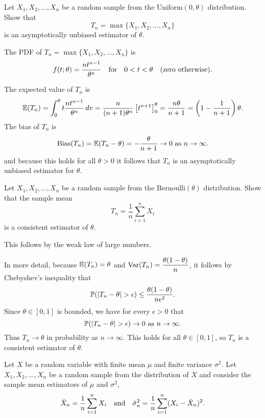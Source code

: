 \begin{exercise}
\begin{questions}

\question
Let $X_1,X_2,\ldots,X_n$ be a random sample from the $\text{Uniform}(0,\theta)$ distribution. Show that 
\[
T_n = \max\{X_1,X_2,\ldots,X_n\}
\]
is an asymptotically unbiased estimator of $\theta$.
\begin{answer}
The PDF of $T_n= \max\{X_1,X_2,\ldots,X_n\}$ is
\[
f(t;\theta)	= \frac{nt^{n-1}}{\theta^n} \quad\text{for\quad $0<t<\theta$\quad (zero otherwise).}
\]

The expected value of $T_n$ is
\[
\mathbb{E}(T_n) 
	= \int_{0}^{\theta }t\frac{nt^{n-1} }{\theta ^{n} }\,dv 
	= \frac{n}{(n+1)\theta ^{n} } \left[ t^{n+1} \right] _{0}^{\theta } 
	= \frac{n\theta }{n +1} 
	= \left(1-\frac{1}{n+1}\right)\theta.
\]
The bias of $T_n$ is
\[
\text{Bias}(T_n) = \mathbb{E}(T_n-\theta) = -\frac{\theta}{n+1} \to 0 \text{ as }n\to\infty.
\]
and because this holds for all $\theta>0$ it follows that $T_n$ is an asymptotically unbiased estimator for $\theta$.
\end{answer}

\question
Let $X_1,X_2,\ldots,X_n$ be a random sample from the $\text{Bernoulli}(\theta)$ distribution. Show that the sample mean 
\[
\displaystyle T_n = \frac{1}{n}\sum_{i=1}^n X_i
\]
is a consistent estimator of $\theta$.

\begin{answer}
This follows by the weak law of large numbers. 
\par
In more detail, because $\mathbb{E}(T_n)=\theta$ and $\text{Var}(T_n) = \displaystyle\frac{\theta(1-\theta)}{n}$, it follows by Chebyshev's inequality that
\[
\prob(|T_n-\theta|>\epsilon) \leq \frac{\theta(1-\theta)}{n\epsilon^2}.
\]
Since $\theta\in[0,1]$ is bounded, we have for every $\epsilon >0$ that
\[
\prob(|T_n-\theta|>\epsilon)\rightarrow 0 \text{ as } n\rightarrow\infty.
\]
Thus $T_n\to\theta$ in probability as $n\to\infty$. This holds for all $\theta\in[0,1]$, so $T_n$ is a consistent estimator of $\theta$.
\end{answer}

\question
Let $X$ be a random variable with finite mean $\mu$ and finite variance $\sigma^2$. Let $X_1,X_2,\ldots,X_n$ be a random sample from the distribution of $X$ and consider the sample mean estimators of $\mu$ and $\sigma^2$,
\[
\bar{X}_n = \frac{1}{n}\sum_{i=1}^n X_i
\quad\text{and}\quad
\hat{\sigma}^2_n = \frac{1}{n}\sum_{i=1}^n (X_i-\bar{X}_n)^2.
\]
\begin{parts}

\end{parts}
\end{questions}
\end{exercise}
